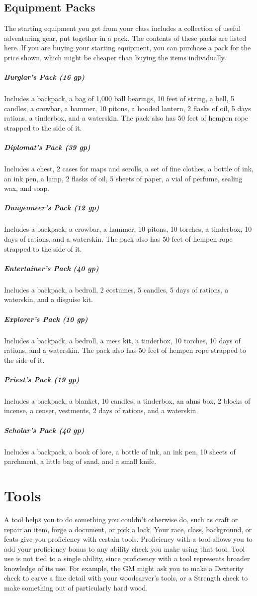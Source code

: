 \subsection{Equipment Packs}

The starting equipment you get from your class includes a collection of useful adventuring gear, put together in a pack. The contents of these packs are listed here. If you are buying your starting equipment, you can purchase a pack for the price shown, which might be cheaper than buying the items individually.

\subparagraph*{Burglar's Pack (16 gp)} Includes a backpack, a bag of 1,000 ball bearings, 10 feet of string, a bell, 5 candles, a crowbar, a hammer, 10 pitons, a hooded lantern, 2 flasks of oil, 5 days rations, a tinderbox, and a waterskin. The pack also has 50 feet of hempen rope strapped to the side of it.

\subparagraph*{Diplomat's Pack (39 gp)} Includes a chest, 2 cases for maps and scrolls, a set of fine clothes, a bottle of ink, an ink pen, a lamp, 2 flasks of oil, 5 sheets of paper, a vial of perfume, sealing wax, and soap.

\subparagraph*{Dungeoneer's Pack (12 gp)} Includes a backpack, a crowbar, a hammer, 10 pitons, 10 torches, a tinderbox, 10 days of rations, and a waterskin. The pack also has 50 feet of hempen rope strapped to the side of it.

\subparagraph*{Entertainer's Pack (40 gp)} Includes a backpack, a bedroll, 2 costumes, 5 candles, 5 days of rations, a waterskin, and a disguise kit.

\subparagraph*{Explorer's Pack (10 gp)} Includes a backpack, a bedroll, a mess kit, a tinderbox, 10 torches, 10 days of rations, and a waterskin. The pack also has 50 feet of hempen rope strapped to the side of it.

\subparagraph*{Priest's Pack (19 gp)} Includes a backpack, a blanket, 10 candles, a tinderbox, an alms box, 2 blocks of incense, a censer, vestments, 2 days of rations, and a waterskin.

\subparagraph*{Scholar's Pack (40 gp)} Includes a backpack, a book of lore, a bottle of ink, an ink pen, 10 sheets of parchment, a little bag of sand, and a small knife.

\section{Tools}

A tool helps you to do something you couldn't otherwise do, such as craft or repair an item, forge a document, or pick a lock. Your race, class, background, or feats give you proficiency with certain tools. Proficiency with a tool allows you to add your proficiency bonus to any ability check you make using that tool. Tool use is not tied to a single ability, since proficiency with a tool represents broader knowledge of its use. For example, the GM might ask you to make a Dexterity check to carve a fine detail with your woodcarver's tools, or a Strength check to make something out of particularly hard wood.

